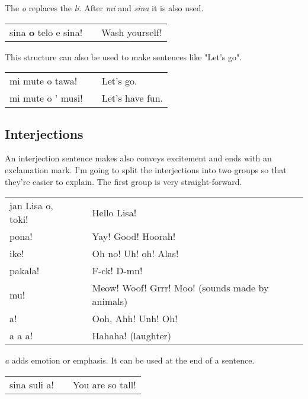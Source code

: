 The \textit{o} replaces the \textit{li}. After \textit{mi}  and \textit{sina} it is also used.

\begin{supertabular}{p{5,5cm}|ll}
sina \textbf{o} telo e sina! && Wash yourself! \\
\end{supertabular} 

This structure can also be used to make sentences like "Let's go".

\begin{supertabular}{p{5,5cm}|ll}
mi mute o tawa! && Let's go. \\
mi mute o ' musi! && Let's have fun. \\
\end{supertabular} 
%
{}
\subsection*{Interjections}
%
An interjection sentence makes also conveys excitement and ends with an exclamation mark.
I'm going to split the interjections into two groups so that they're easier to explain. 
The first group is very straight-forward.

\begin{supertabular}{p{5,5cm}|ll}
jan Lisa o, toki! && Hello Lisa! \\
pona! && Yay! Good! Hoorah! \\
ike! && Oh no! Uh! oh! Alas! \\
pakala! && F-ck! D-mn! \\
mu! && Meow! Woof! Grrr! Moo! (sounds made by animals) \\
a! && Ooh, Ahh! Unh! Oh! \\
a a a! && Hahaha! (laughter) \\
\end{supertabular} 

\textit{a} adds emotion or emphasis. It can be used at the end of a sentence.

\begin{supertabular}{p{5,5cm}|ll}
sina suli a! && You are so tall! \\
\end{supertabular} 

